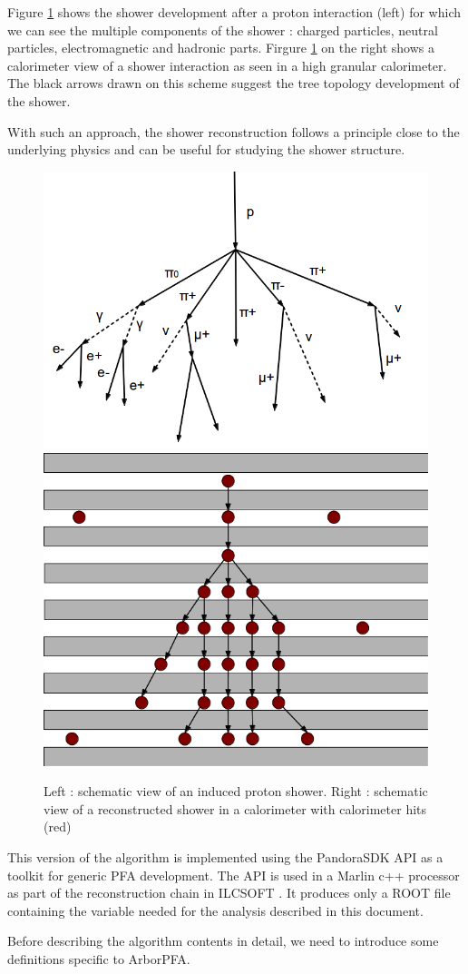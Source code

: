 \documentclass[cits]{JINST}
\begin{document}
Figure \ref{ARBOR_STRUCTURE} shows the shower development after a proton interaction (left) for which we can see the multiple components of the shower : charged particles, neutral particles, electromagnetic and hadronic parts.
Firgure \ref{ARBOR_STRUCTURE} on the right shows a calorimeter view of a shower interaction as seen in a high granular calorimeter. The black arrows drawn on this scheme suggest the tree topology development of the shower.

With such an approach, the shower reconstruction follows a principle close to the underlying physics and can be useful for studying the shower structure. 

  
\begin{figure}[!ht]
  \begin{center}
    \includegraphics[width=0.45\linewidth]{ProtonDecay.png} \hfill
    \includegraphics[width=0.45\linewidth]{ArborSchema.png}
  \end{center}
  \caption{\label{ARBOR_STRUCTURE} Left : schematic view of an induced proton shower. Right : schematic view of a reconstructed shower in a calorimeter with calorimeter hits (red)}
\end{figure}

This version of the algorithm is implemented using the PandoraSDK API as a toolkit for generic PFA development. The API is used in a Marlin c++ processor as part of the reconstruction chain in ILCSOFT \cite{ilcsoft}. It produces only a ROOT \cite{root} file containing the variable needed for the analysis described in this document.

Before describing the algorithm contents in detail, we need to introduce some definitions specific to ArborPFA.
\end{document}
